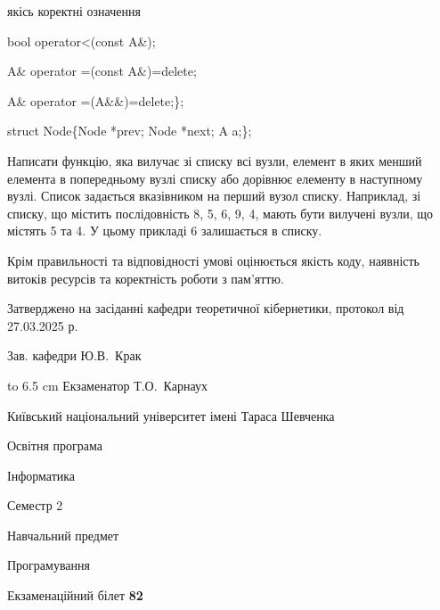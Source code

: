 \documentclass[12pt, ukrainian]{article}
\begin{document}
{\quad  якісь коректні означення 

\quad  bool operator<(const A\&); 

\quad A\& operator =(const A\&)=delete; 

\quad  A\& operator =(A\&\&)=delete;\};

struct Node\{Node *prev; Node *next; A a;\};

Написати функцію, яка вилучає зі списку всі вузли, елемент в яких менший елемента в попередньому вузлі списку або дорівнює елементу в наступному вузлі. Список задається вказівником на перший вузол списку. Наприклад, зі списку, що містить послідовність 8, 5, 6, 9, 4, мають бути вилучені вузли, що містять 5 та 4. У цьому прикладі 6 залишається в списку.

Крім правильності та відповідності умові оцінюється якість коду, наявність витоків ресурсів та коректність роботи з пам'яттю. 

}
{\smallskip\smallskip \begin {scriptsize} Затверджено на засіданні кафедри теоретичної кібернетики, протокол   від   27.03.2025 р.\par\smallskip\smallskip\smallskip\smallskip
{\parbox {6.5 cm} {Зав. кафедри \dotfill Ю.В.~Крак}}\hspace {0.7cm} {\hbox to 6.5 cm { Екзаменатор \dotfill Т.О.~Карнаух}} \end{scriptsize}}
\newpage
{{\begin {scriptsize}\par
{ \center  Київський національний університет імені Тараса Шевченка \par}
{\parbox {5 cm}{Освітня програма \hfill}{\parbox {7 cm}{Інформатика\hfill}}\parbox {6 cm}{\hfill Семестр 2}}\par
{\parbox {5 cm} {Навчальний предмет \hfill}\parbox {7 cm}{Програмування \hfill}\parbox {6cm}{\hfill}\par}\vspace{-15pt} \end{scriptsize}}{\center Екзаменаційний білет \No \textbf { 82 }\par}}
\end{document}
